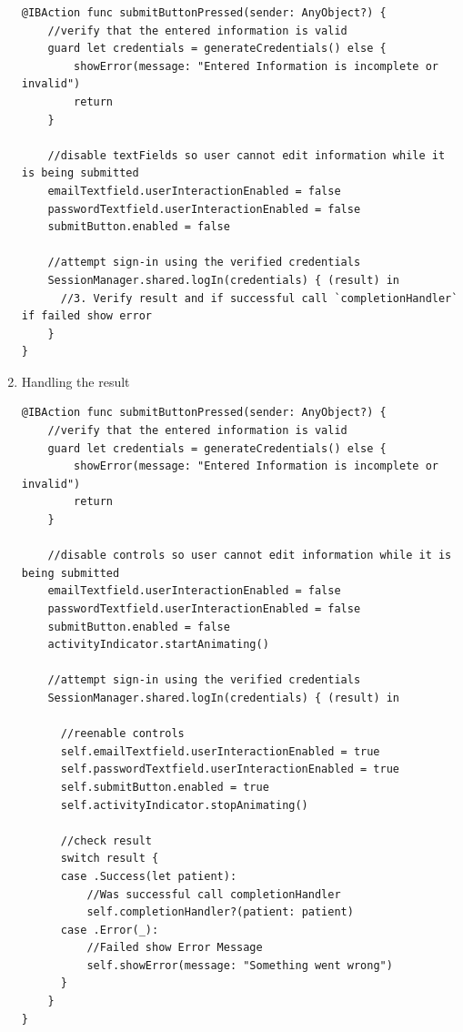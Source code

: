 \documentclass{article}
\begin{document}
\begin{enumerate}
\begin{verbatim}
@IBAction func submitButtonPressed(sender: AnyObject?) {
    //verify that the entered information is valid
    guard let credentials = generateCredentials() else {
        showError(message: "Entered Information is incomplete or invalid")
        return
    }

    //disable textFields so user cannot edit information while it is being submitted
    emailTextfield.userInteractionEnabled = false
    passwordTextfield.userInteractionEnabled = false
    submitButton.enabled = false

    //attempt sign-in using the verified credentials
    SessionManager.shared.logIn(credentials) { (result) in
      //3. Verify result and if successful call `completionHandler` if failed show error
    }
}
\end{verbatim}
\item{Handling the result}\label{handling-the-result}

\begin{verbatim}
@IBAction func submitButtonPressed(sender: AnyObject?) {
    //verify that the entered information is valid
    guard let credentials = generateCredentials() else {
        showError(message: "Entered Information is incomplete or invalid")
        return
    }

    //disable controls so user cannot edit information while it is being submitted
    emailTextfield.userInteractionEnabled = false
    passwordTextfield.userInteractionEnabled = false
    submitButton.enabled = false
    activityIndicator.startAnimating()

    //attempt sign-in using the verified credentials
    SessionManager.shared.logIn(credentials) { (result) in

      //reenable controls
      self.emailTextfield.userInteractionEnabled = true
      self.passwordTextfield.userInteractionEnabled = true
      self.submitButton.enabled = true
      self.activityIndicator.stopAnimating()

      //check result
      switch result {
      case .Success(let patient):
          //Was successful call completionHandler
          self.completionHandler?(patient: patient)
      case .Error(_):
          //Failed show Error Message
          self.showError(message: "Something went wrong")
      }
    }
}
\end{verbatim}

\end{enumerate}
\end{document}
